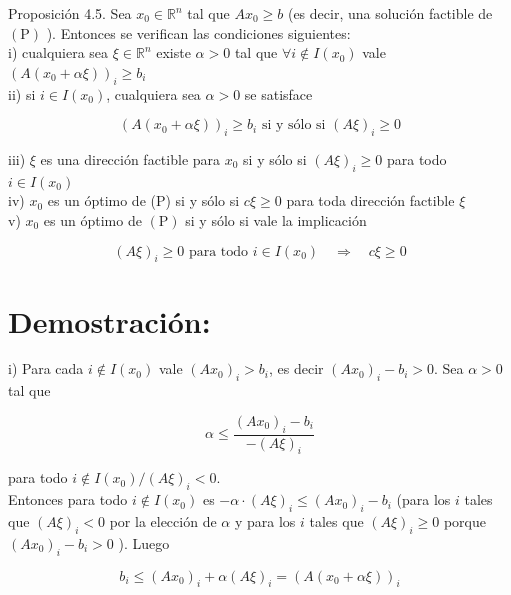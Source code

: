 \documentclass[10pt]{article}
\begin{document}
Proposición 4.5. Sea $x_{0} \in \mathbb{R}^{n}$ tal que $A x_{0} \geq b$ (es decir, una solución factible de $(\mathrm{P})$ ). Entonces se verifican las condiciones siguientes:\\
i) cualquiera sea $\xi \in \mathbb{R}^{n}$ existe $\alpha>0$ tal que $\forall i \notin I\left(x_{0}\right)$ vale $\left(A\left(x_{0}+\alpha \xi\right)\right)_{i} \geq b_{i}$\\
ii) si $i \in I\left(x_{0}\right)$, cualquiera sea $\alpha>0$ se satisface

$$
\left(A\left(x_{0}+\alpha \xi\right)\right)_{i} \geq b_{i} \text { si y sólo si }(A \xi)_{i} \geq 0
$$

iii) $\xi$ es una dirección factible para $x_{0}$ si y sólo si $(A \xi)_{i} \geq 0$ para todo $i \in I\left(x_{0}\right)$\\
iv) $x_{0}$ es un óptimo de (P) si y sólo si $c \xi \geq 0$ para toda dirección factible $\xi$\\
v) $x_{0}$ es un óptimo de $(\mathrm{P})$ si y sólo si vale la implicación

$$
(A \xi)_{i} \geq 0 \text { para todo } i \in I\left(x_{0}\right) \quad \Longrightarrow \quad c \xi \geq 0
$$

\section*{Demostración:}
i) Para cada $i \notin I\left(x_{0}\right)$ vale $\left(A x_{0}\right)_{i}>b_{i}$, es decir $\left(A x_{0}\right)_{i}-b_{i}>0$. Sea $\alpha>0$ tal que

$$
\alpha \leq \frac{\left(A x_{0}\right)_{i}-b_{i}}{-(A \xi)_{i}}
$$

para todo $i \notin I\left(x_{0}\right) /(A \xi)_{i}<0$.\\
Entonces para todo $i \notin I\left(x_{0}\right)$ es $-\alpha \cdot(A \xi)_{i} \leq\left(A x_{0}\right)_{i}-b_{i}$ (para los $i$ tales que $(A \xi)_{i}<0$ por la elección de $\alpha$ y para los $i$ tales que $(A \xi)_{i} \geq 0$ porque $\left(A x_{0}\right)_{i}-b_{i}>0$ ). Luego

$$
b_{i} \leq\left(A x_{0}\right)_{i}+\alpha(A \xi)_{i}=\left(A\left(x_{0}+\alpha \xi\right)\right)_{i}
$$
\end{document}
